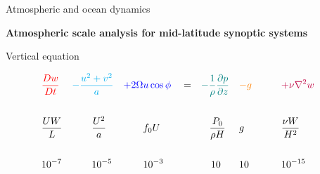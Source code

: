 \documentclass[aspectratio=169,xcolor=dvipsnames]{beamer}
\begin{document}
\begin{frame}[t]{Atmospheric and ocean dynamics}

\vspace{-1.0em}

\begin{center}
\textbf{{\large
Atmospheric scale analysis for mid-latitude synoptic systems
}}
\end{center}

\small 
\center 

\vspace{-0.5em}

Vertical equation

\begin{align*}
    &\textcolor{red}{    \frac{Dw}{Dt}   } &
    &\textcolor{cyan}{   - \frac{u^2 + v^2}{a}   }&
    &\textcolor{blue}{   + 2\Omega u \cos\phi    }&
    & = &
    &\textcolor{teal}{   -\frac{1}{\rho}\frac{\partial p}{\partial z} }&
    &\textcolor{orange}{- g \quad}&
    &\textcolor{purple}{\quad + \nu \nabla^2 w }&
    \\ \\
      &\textcolor{black}{   \frac{UW}{L}   } &
      &\textcolor{black}{   \quad\quad\frac{U^2}{a} }&
      &\textcolor{black}{\quad\quad f_0 U }&
      &&
      &\textcolor{black}{\,\,\,\,\,\frac{P_0} {\rho H}  }&
      &\textcolor{black}{  g    }&
      &\textcolor{black}{\quad\frac{\nu W}{H^2} }&
    \\ \\
      &\textcolor{black}{   10^{-7} }&
      &\textcolor{black}{\quad\quad10^{-5} }&
      &\textcolor{black}{\quad\quad10^{-3} }&
      &&
      &\textcolor{black}{\quad 10  }&
      &\textcolor{black}{10     }&
      &\textcolor{black}{\quad10^{-15}}&
\end{align*}

\end{frame}

\end{document}
